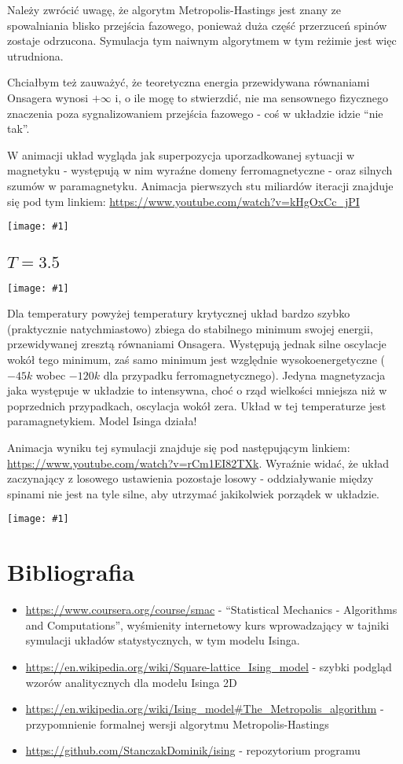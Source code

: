 \documentclass[11pt]{article}
\newcommand{\largepng}[1]{\begin{center}\texttt{[image: \#1]}\end{center}}
\begin{document}
Należy zwrócić uwagę, że algorytm Metropolis-Hastings jest znany ze
spowalniania blisko przejścia fazowego, ponieważ duża część przerzuceń spinów zostaje odrzucona. Symulacja tym
naiwnym algorytmem w tym reżimie jest więc utrudniona.

Chciałbym też zauważyć, że teoretyczna energia przewidywana równaniami Onsagera wynosi $+\infty$ i, o ile mogę to stwierzdić,
nie ma sensownego fizycznego znaczenia poza sygnalizowaniem przejścia fazowego - coś w układzie idzie ``nie tak''.

W animacji układ wygląda jak superpozycja uporzadkowanej sytuacji w magnetyku - występują w nim wyraźne domeny ferromagnetyczne - oraz
silnych szumów w paramagnetyku. Animacja pierwszych stu miliardów iteracji znajduje się pod tym linkiem: \url{https://www.youtube.com/watch?v=kHgOxCc_jPI}

\largepng{../data/N256_T2.3/final.png}

\subsection{$T=3.5$}

\largepng{../data/N256_T3.5/plot.png}

Dla temperatury powyżej temperatury krytycznej układ bardzo szybko (praktycznie natychmiastowo) zbiega do stabilnego minimum
swojej energii, przewidywanej zresztą równaniami Onsagera. Występują jednak silne oscylacje wokół tego minimum, zaś samo minimum
jest względnie wysokoenergetyczne ($-45k$ wobec $-120k$ dla przypadku ferromagnetycznego). Jedyna magnetyzacja jaka występuje w
układzie to intensywna, choć o rząd wielkości mniejsza niż w poprzednich przypadkach, oscylacja wokół zera. Układ w tej temperaturze jest
paramagnetykiem. Model Isinga działa!

Animacja wyniku tej symulacji znajduje się pod następującym linkiem: \url{https://www.youtube.com/watch?v=rCm1EI82TXk}. Wyraźnie widać, że układ zaczynający
z losowego ustawienia pozostaje losowy - oddziaływanie między spinami nie jest na tyle silne, aby utrzymać jakikolwiek porządek w układzie.

\largepng{../data/N256_T3.5/final.png}


\section{Bibliografia}
  \begin{itemize}
      \item \url{https://www.coursera.org/course/smac} - ``Statistical Mechanics -
      Algorithms and Computations'', wyśmienity internetowy kurs wprowadzający w tajniki symulacji układów statystycznych, w tym modelu Isinga.
      \item \url{https://en.wikipedia.org/wiki/Square-lattice_Ising_model} - szybki podgląd wzorów analitycznych dla modelu Isinga 2D
      \item \url{https://en.wikipedia.org/wiki/Ising_model#The_Metropolis_algorithm} - przypomnienie formalnej wersji algorytmu Metropolis-Hastings
      \item \url{https://github.com/StanczakDominik/ising} - repozytorium programu
  \end{itemize}
\end{document}
